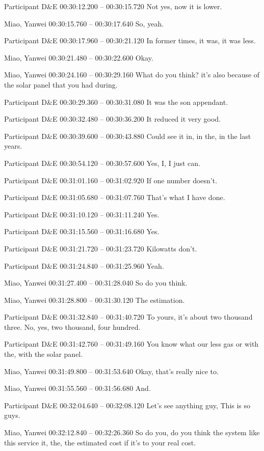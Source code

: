 {Participant D\&E 00:30:12.200 -- 00:30:15.720
Not yes, now it is lower.

Miao, Yanwei 00:30:15.760 -- 00:30:17.640
So, yeah.

Participant D\&E 00:30:17.960 -- 00:30:21.120
In former times, it was, it was less.

Miao, Yanwei 00:30:21.480 -- 00:30:22.600
Okay.

Miao, Yanwei 00:30:24.160 -- 00:30:29.160
What do you think? it's also because of the solar panel that you had during.

Participant D\&E 00:30:29.360 -- 00:30:31.080
It was the son appendant.

Participant D\&E 00:30:32.480 -- 00:30:36.200
It reduced it very good.

Participant D\&E 00:30:39.600 -- 00:30:43.880
Could see it in, in the, in the last years.

Participant D\&E 00:30:54.120 -- 00:30:57.600
Yes, I, I just can.

Participant D\&E 00:31:01.160 -- 00:31:02.920
If one number doesn't.

Participant D\&E 00:31:05.680 -- 00:31:07.760
That's what I have done.

Participant D\&E 00:31:10.120 -- 00:31:11.240
Yes.

Participant D\&E 00:31:15.560 -- 00:31:16.680
Yes.

Participant D\&E 00:31:21.720 -- 00:31:23.720
Kilowatts don't.

Participant D\&E 00:31:24.840 -- 00:31:25.960
Yeah.

Miao, Yanwei 00:31:27.400 -- 00:31:28.040
So do you think.

Miao, Yanwei 00:31:28.800 -- 00:31:30.120
The estimation.

Participant D\&E 00:31:32.840 -- 00:31:40.720
To yours, it's about two thousand three. No, yes, two thousand, four hundred.

Participant D\&E 00:31:42.760 -- 00:31:49.160
You know what our less gas or with the, with the solar panel.

Miao, Yanwei 00:31:49.800 -- 00:31:53.640
Okay, that's really nice to.

Miao, Yanwei 00:31:55.560 -- 00:31:56.680
And.

Participant D\&E 00:32:04.640 -- 00:32:08.120
Let's see anything guy, This is so guys.

Miao, Yanwei 00:32:12.840 -- 00:32:26.360
So do you, do you think the system like this service it, the, the estimated cost if it's to your real cost.

}
